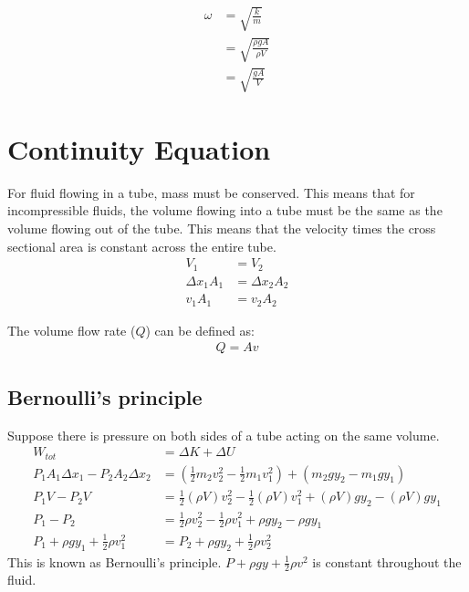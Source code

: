 \documentclass{article}
\theoremstyle{mytheoremstyle}
\theoremstyle{mytheoremstyle}
\theoremstyle{myproblemstyle}
\begin{document}
    \begin{align*}
        \omega &= \sqrt{\frac{k}{m}} \\
        &= \sqrt{\frac{\rho g A}{\rho V}} \\
        &= \sqrt{\frac{g A}{V}}
    \end{align*}

    \section*{Continuity Equation}
    For fluid flowing in a tube, mass must be conserved. This means that for
    incompressible fluids, the volume flowing into a tube must be the same as
    the volume flowing out of the tube. This means that the velocity times the
    cross sectional area is constant across
    the entire tube.
    \begin{align*}
        V_1 &= V_2 \\
        \Delta x_1 A_1 &= \Delta x_2 A_2 \\
        v_1 A_1 &= v_2 A_2
    \end{align*}

    The volume flow rate ($Q$) can be defined as:
    \begin{align*}
        Q = Av
    \end{align*}

    \subsection*{Bernoulli's principle}
    Suppose there is pressure on both sides of a tube acting on the same volume.
    \begin{align*}
        W_{tot} &= \Delta K + \Delta U \\
        P_1A_1\Delta x_1 - P_2A_2\Delta x_2
                &= (\frac{1}{2} m_2v_2^2 - \frac{1}{2} m_1v_1^2)
                + (m_2gy_2 - m_1gy_1) \\
        P_1V-P_2V
                &= \frac{1}{2} (\rho V)v_2^2 - \frac{1}{2} (\rho V)v_1^2
                + (\rho V)gy_2 - (\rho V)gy_1 \\
        P_1-P_2 &= \frac{1}{2} \rho v_2^2 - \frac{1}{2} \rho v_1^2
                + \rho g y_2 - \rho g y_1\\
        P_1 + \rho g y_1 + \frac{1}{2} \rho v_1^2
                &= P_2 + \rho g y_2 + \frac{1}{2} \rho v_2^2
    \end{align*}
    This is known as Bernoulli's principle. $P + \rho gy + \frac{1}{2} \rho v^2$
    is constant throughout the fluid.
\end{document}
